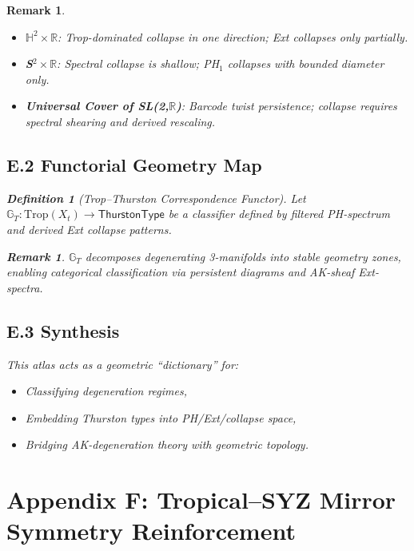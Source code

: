 \documentclass[11pt]{article}
\newtheorem{definition}[theorem]{Definition}
\newtheorem{remark}[theorem]{Remark}
\begin{document}
\begin{remark}
\begin{itemize}
  \item \textbf{$\mathbb{H}^2 \times \mathbb{R}$}:  
  Trop-dominated collapse in one direction; Ext collapses only partially.

  \item \textbf{S$^2 \times \mathbb{R}$}:  
  Spectral collapse is shallow; PH$_1$ collapses with bounded diameter only.

  \item \textbf{Universal Cover of SL(2,$\mathbb{R}$)}:  
  Barcode twist persistence; collapse requires spectral shearing and derived rescaling.
\end{itemize}

\subsection*{E.2 Functorial Geometry Map}

\begin{definition}[Trop--Thurston Correspondence Functor]
Let $\mathbb{G}_T: \mathrm{Trop}(X_t) \to \mathsf{ThurstonType}$  
be a classifier defined by filtered PH-spectrum and derived Ext collapse patterns.
\end{definition}

\begin{remark}
$\mathbb{G}_T$ decomposes degenerating 3-manifolds into stable geometry zones,  
enabling categorical classification via persistent diagrams and AK-sheaf Ext-spectra.
\end{remark}

\subsection*{E.3 Synthesis}

This atlas acts as a geometric “dictionary” for:
\begin{itemize}
    \item Classifying degeneration regimes,
    \item Embedding Thurston types into PH/Ext/collapse space,
    \item Bridging AK-degeneration theory with geometric topology.
\end{itemize}

\section*{Appendix F: Tropical–SYZ Mirror Symmetry Reinforcement}


\end{remark}
\end{document}
